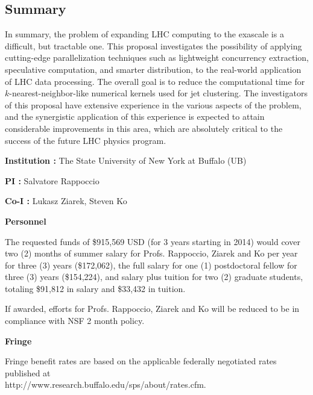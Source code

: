 \documentclass[times,11pt]{article}
\begin{document}
\subsection{Summary}

In summary, the problem of expanding LHC computing to the exascale is
a difficult, but tractable one. This proposal investigates the
possibility of applying cutting-edge parallelization techniques such
as lightweight concurrency extraction, speculative computation, and
smarter distribution, to the
real-world application of LHC data processing.
The overall goal is to reduce the computational time for
$k$-nearest-neighbor-like numerical kernels used for jet
clustering. The investigators of this
proposal have extensive experience in the various aspects of the
problem, and the synergistic application of this experience is
expected to attain considerable improvements in this area, which
are absolutely critical to the success of the future LHC physics
program. 



\newpage
{}
\renewcommand{\thepage} {A--\arabic{page}}



{}
%

\newpage
{}
\renewcommand{\thepage} {B--\arabic{page}}

\bigskip
{\bf Institution : } The State University of New York at Buffalo (UB)

{\bf PI : } Salvatore Rappoccio

{\bf Co-I : } Lukasz Ziarek, Steven Ko


\bigskip
{\bf Personnel}
\bigskip


The requested funds of \$915,569 USD (for 3 years starting in 2014)
would cover two (2) months of summer salary for Profs. Rappoccio,
Ziarek and Ko per
year for three (3) years
(\$172,062), the full salary for 
one (1) postdoctoral fellow for three (3)
years (\$154,224), and salary plus
tuition for two (2) graduate students, totaling \$91,812 in
salary and \$33,432 in tuition. 

If awarded, efforts for Profs. Rappoccio, Ziarek and Ko will be
reduced to be in compliance with NSF 2 month policy. 

\bigskip
{\bf Fringe}
\bigskip


Fringe benefit rates are based on the applicable federally negotiated rates published at
\\
http://www.research.buffalo.edu/sps/about/rates.cfm.
\end{document}
